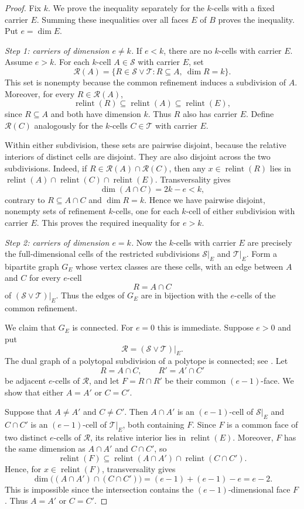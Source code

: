 \documentclass[a4paper,12pt]{amsart}
\theoremstyle{definition}
\theoremstyle{remark}
\newcommand{\relint}{\operatorname{relint}}
\begin{document}
\begin{proof}
Fix $k$.
We prove the inequality separately for the $k$-cells with a fixed carrier $E$.
Summing these inequalities over all faces $E$ of $B$ proves the inequality.
Put $e=\dim E$.

\noindent\emph{Step 1: carriers of dimension $e\neq k$.}
If $e<k$, there are no $k$-cells with carrier $E$.
Assume $e>k$.
For each $k$-cell $A\in\mathcal S$ with carrier $E$, set
\[
 \mathcal R(A)=  \{R\in\mathcal S\vee\mathcal T:R\subseteq A,\ \dim R=k\}.
\]
This set is nonempty because the common refinement induces a subdivision of $A$.
Moreover, for every $R\in\mathcal R(A)$,
\[
 \relint(R)\subseteq\relint(A)\subseteq\relint(E),
\]
since $R\subseteq A$ and both have dimension $k$.
Thus $R$ also has carrier $E$.
Define $\mathcal R(C)$ analogously for the $k$-cells $C\in\mathcal T$ with carrier $E$.

Within either subdivision, these sets are pairwise disjoint, because the relative interiors of distinct cells are disjoint.
They are also disjoint across the two subdivisions.
Indeed, if $R\in\mathcal R(A)\cap\mathcal R(C)$, then any $x\in\relint(R)$ lies in $\relint(A)\cap\relint(C)\cap\relint(E)$.
Transversality gives
\[
 \dim(A\cap C)=2k-e<k,
\]
contrary to $R\subseteq A\cap C$ and $\dim R=k$.
Hence we have pairwise disjoint, nonempty sets of refinement $k$-cells, one for each $k$-cell of either subdivision with carrier $E$.
This proves the required inequality for $e>k$.

\noindent\emph{Step 2: carriers of dimension $e=k$.}
Now the $k$-cells with carrier $E$ are precisely the full-dimensional cells of the restricted subdivisions $\mathcal S|_E$ and $\mathcal T|_E$.
Form a bipartite graph $G_E$ whose vertex classes are these cells, with an edge  between $A$ and $C$ for every $e$-cell
\[
 R=A\cap C
\]
of $(\mathcal S\vee\mathcal T)|_E$.
Thus the edges of $G_E$ are in bijection with the $e$-cells of the common refinement.

We claim that $G_E$ is connected.
For $e=0$ this is immediate.
Suppose $e>0$ and put
\[
 \mathcal R=(\mathcal S\vee\mathcal T)|_E.
\]
The dual graph of a polytopal subdivision of a polytope is connected; see \cite[Lemma~2]{CJK25}.
Let
\[
 R=A\cap C,\qquad R'=A'\cap C'
\]
be adjacent $e$-cells of $\mathcal R$, and let $F=R\cap R'$ be their common $(e-1)$-face.
We show that either $A=A'$ or $C=C'$.

Suppose that $A\neq A'$ and $C\neq C'$.
Then $A\cap A'$ is an $(e-1)$-cell of $\mathcal S|_E$ and $C\cap C'$ is an $(e-1)$-cell of $\mathcal T|_E$, both containing $F$.
Since $F$ is a common face of two distinct $e$-cells of $\mathcal R$, its relative interior lies in $\relint(E)$.
Moreover, $F$ has the same dimension as $A\cap A'$ and $C\cap C'$, so
\[
 \relint(F)\subseteq\relint(A\cap A')\cap\relint(C\cap C').
\]
Hence, for $x\in\relint(F)$, transversality gives
\[
 \dim\bigl((A\cap A')\cap(C\cap C')\bigr)  =(e-1)+(e-1)-e=e-2.
\]
This is impossible since the intersection contains the $(e-1)$-dimensional face $F$.
Thus $A=A'$ or $C=C'$.


\end{proof}
\end{document}

